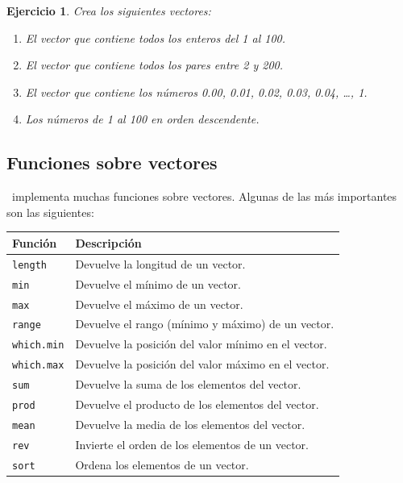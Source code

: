 \documentclass[11pt,a4paper]{article}
\newcommand{\R}{\textcolor{azuluc}{\faIcon{r-project}}}
\theoremstyle{exercise}
\newtheorem{exercise}{Ejercicio}
\begin{document}
\begin{exercise}
Crea los siguientes vectores:
\begin{enumerate}
	\item[a)] El vector que contiene todos los enteros del 1 al 100.
	\item[b)] El vector que contiene todos los pares entre 2 y 200.
	\item[c)] El vector que contiene los números 0.00, 0.01, 0.02, 0.03, 0.04, \ldots, 1.
	\item[d)] Los números de 1 al 100 en orden descendente.
\end{enumerate}
\end{exercise}

\subsection{Funciones sobre vectores}

\R\ implementa muchas funciones sobre vectores. Algunas de las más importantes son las siguientes:

\begin{center}
	\begin{tabular}{|l|l|}
		\hline
		Función & Descripción \\		
		\hline
		\verb|length| & Devuelve la longitud de un vector. \\
		\verb|min| & Devuelve el mínimo de un vector. \\
		\verb|max| & Devuelve el máximo de un vector. \\
		\verb|range| & Devuelve el rango (mínimo y máximo) de un vector. \\
		\verb|which.min| & Devuelve la posición del valor mínimo en el vector. \\
		\verb|which.max| & Devuelve la posición del valor máximo en el vector. \\
		\verb|sum| & Devuelve la suma de los elementos del vector. \\
		\verb|prod| & Devuelve el producto de los elementos del vector. \\
		\verb|mean| & Devuelve la media de los elementos del vector. \\
		\verb|rev| & Invierte el orden de los elementos de un vector. \\
		\verb|sort| & Ordena los elementos de un vector. \\ \hline
	\end{tabular}
\end{center}
\end{document}
